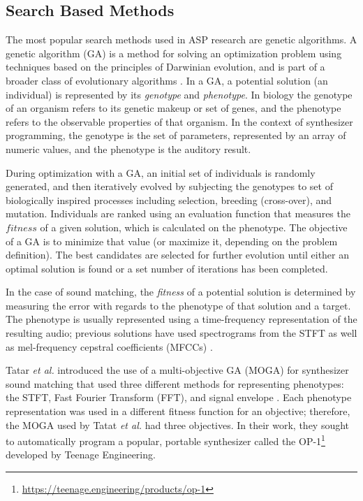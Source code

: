 \subsection{Search Based Methods}
The most popular search methods used in ASP research are genetic algorithms. A genetic algorithm (GA) is a method for solving an optimization problem using techniques based on the principles of Darwinian evolution, and is part of a broader class of evolutionary algorithms \cite{whitley1994genetic}. In a GA, a potential solution (an individual) is represented by its \textit{genotype} and \textit{phenotype}. In biology the genotype of an organism refers to its genetic makeup or set of genes, and the phenotype refers to the observable properties of that organism. In the context of synthesizer programming, the genotype is the set of parameters, represented by an array of numeric values, and the phenotype is the auditory result. 

During optimization with a GA, an initial set of individuals is randomly generated, and then iteratively evolved by subjecting the genotypes to set of biologically inspired processes including selection, breeding (cross-over), and mutation. Individuals are ranked using an evaluation function that measures the $fitness$ of a given solution, which is calculated on the phenotype. The objective of a GA is to minimize that value (or maximize it, depending on the problem definition). The best candidates are selected for further evolution until either an optimal solution is found or a set number of iterations has been completed.

In the case of sound matching, the \textit{fitness} of a potential solution is determined by measuring the error with regards to the phenotype of that solution and a target. The phenotype is usually represented using a time-frequency representation of the resulting audio; previous solutions have used spectrograms from the STFT \cite{horner1993machine, tatar2016automatic, masudo2021quality} as well as mel-frequency cepstral coefficients (MFCCs) \cite{yee2008synthbot, roth2011comparison, macret2014automatic, smith2017play}.


Tatar \textit{et al.} introduced the use of a multi-objective GA (MOGA) for synthesizer sound matching that used three different methods for representing phenotypes: the STFT, Fast Fourier Transform (FFT), and signal envelope \cite{tatar2016automatic}. Each phenotype representation was used in a different fitness function for an objective; therefore, the MOGA used by Tatat \textit{et al.} had three objectives. In their work, they sought to automatically program a popular, portable synthesizer called the OP-1\footnote{\url{https://teenage.engineering/products/op-1}} developed by Teenage Engineering.

